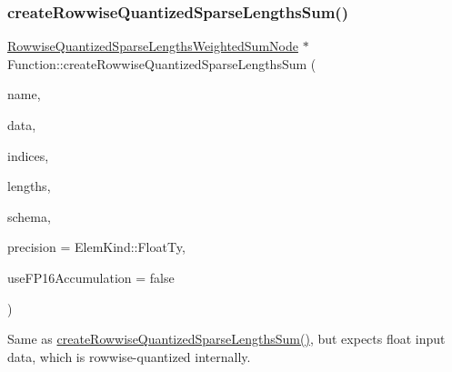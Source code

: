 \subsubsection{\texorpdfstring{create\+Rowwise\+Quantized\+Sparse\+Lengths\+Sum()}{createRowwiseQuantizedSparseLengthsSum()}\hspace{0.1cm}{\footnotesize\ttfamily [2/2]}}
{\footnotesize\ttfamily \hyperlink{classglow_1_1_rowwise_quantized_sparse_lengths_weighted_sum_node}{Rowwise\+Quantized\+Sparse\+Lengths\+Weighted\+Sum\+Node} $\ast$ Function\+::create\+Rowwise\+Quantized\+Sparse\+Lengths\+Sum (\begin{DoxyParamCaption}\item[{llvm\+::\+String\+Ref}]{name,  }\item[{\hyperlink{classglow_1_1_tensor}{Tensor} \&}]{data,  }\item[{\hyperlink{structglow_1_1_node_value}{Node\+Value}}]{indices,  }\item[{\hyperlink{structglow_1_1_node_value}{Node\+Value}}]{lengths,  }\item[{quantization\+::\+Schema}]{schema,  }\item[{\hyperlink{namespaceglow_ab92e14a94329daf4083db670e95fbcdf}{Elem\+Kind}}]{precision = {\ttfamily ElemKind\+:\+:FloatTy},  }\item[{bool}]{use\+F\+P16\+Accumulation = {\ttfamily false} }\end{DoxyParamCaption})}

Same as \hyperlink{classglow_1_1_function_a336683b0ec8e06e084caec12f60142fd}{create\+Rowwise\+Quantized\+Sparse\+Lengths\+Sum()}, but expects float input {\ttfamily data}, which is rowwise-\/quantized internally. \mbox{\label{classglow_1_1_function_ae17510e67747d910c5ba7999ff498ea5}} 

